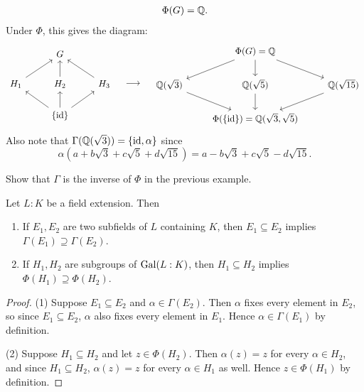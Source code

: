 \begin{example}
\begin{gather*}
    \Phi(G) = \mathbb{Q}.
  \end{gather*}
  Under $\Phi$, this gives the diagram:
  \[
  \begin{tikzcd}
    & G \\
    H_1 \urar & H_2 \uar & H_3 \ular \\
    & \{\id\} \ular \uar \urar
  \end{tikzcd} \quad
  \longrightarrow \quad
  \begin{tikzcd}
    & \Phi(G) = \Q \drar \dar \dlar \\
    \Q(\sqrt{3}) \drar & \Q(\sqrt{5}) \dar & \Q(\sqrt{15}) \dlar \\
    & \Phi(\{\id\}) = \Q(\sqrt{3}, \sqrt{5})
  \end{tikzcd}
  \]
  Also note that
  $\Gamma(\mathbb{Q}(\sqrt{3})) = \{\mathrm{id}, \alpha\}$ since
  \[
    \alpha(a + b\sqrt{3} + c\sqrt{5} + d\sqrt{15})
    = a - b\sqrt{3} + c\sqrt{5} - d\sqrt{15}.
  \]
\end{example}

\begin{exercise}
  Show that $\Gamma$ is the inverse of $\Phi$ in the
  previous example.
\end{exercise}

\begin{theorem}
  Let $L : K$ be a field extension. Then
  \begin{enumerate}
    \item If $E_1, E_2$ are two subfields of $L$
      containing $K$, then
      $E_1 \subseteq E_2$ implies
      $\Gamma(E_1) \supseteq \Gamma(E_2)$.
    \item If $H_1, H_2$ are subgroups of $\operatorname{Gal}(L : K)$,
      then $H_1 \subseteq H_2$ implies
      $\Phi(H_1) \supseteq \Phi(H_2)$.
  \end{enumerate}
\end{theorem}

\begin{proof}
  (1) Suppose $E_1 \subseteq E_2$ and $\alpha \in \Gamma(E_2)$.
  Then $\alpha$ fixes every element in $E_2$, so since
  $E_1 \subseteq E_2$, $\alpha$ also fixes every element
  in $E_1$. Hence $\alpha \in \Gamma(E_1)$ by
  definition.

  (2) Suppose $H_1 \subseteq H_2$ and let $z \in \Phi(H_2)$.
  Then $\alpha(z) = z$ for every $\alpha \in H_2$, and
  since $H_1 \subseteq H_2$, $\alpha(z) = z$ for every
  $\alpha \in H_1$ as well. Hence $z \in \Phi(H_1)$ by
  definition.
\end{proof}

